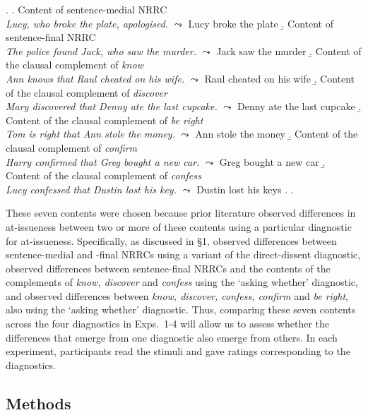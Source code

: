 \documentclass[times,linguex,xcolor]{glossa}
\begin{document}
  \ex.\label{stims}
    \a.\label{stims.a} Content of sentence-medial NRRC \\
      \emph{Lucy, who broke the plate, apologised.} $\leadsto$ Lucy broke the plate
    \b.\label{stims.b} Content of sentence-final NRRC \\
    \emph{The police found Jack, who saw the murder.} $\leadsto$ Jack saw the murder
    \b.\label{stims.c} Content of the clausal complement of \emph{know} \\
    \emph{Ann knows that Raul cheated on his wife.} $\leadsto$ Raul cheated on his wife
    \b.\label{stims.d} Content of the clausal complement of \emph{discover} \\
    \emph{Mary discovered that Denny ate the last cupcake.} $\leadsto$ Denny ate the last cupcake
    \b.\label{stims.e} Content of the clausal complement of \emph{be right} \\
    \emph{Tom is right that Ann stole the money.} $\leadsto$ Ann stole the money
    \b.\label{stims.f} Content of the clausal complement of \emph{confirm} \\
    \emph{Harry confirmed that Greg bought a new car.} $\leadsto$ Greg bought a new car
    \b.\label{stims.g} Content of the clausal complement of \emph{confess}  \\
    \emph{Lucy confessed that Dustin lost his key.} $\leadsto$ Dustin lost his keys
    \z.
  \z.

  These seven contents were chosen because prior literature observed differences in at-issueness between two or more of these contents using a particular diagnostic for at-issueness.  Specifically, as discussed in \S1, \citealt{syrett_experimental_2015} observed differences between sentence-medial and -final NRRCs using a variant of the direct-dissent diagnostic, \citealt{tonhauser_how_2018} observed differences between sentence-final NRRCs and the contents of the complements of \emph{know, discover} and \emph{confess} using the `asking whether' diagnostic, and \citealt{degen-tonhauser-glossa} observed differences between \emph{know, discover, confess, confirm} and \emph{be right}, also using the `asking whether' diagnostic. Thus, comparing these seven contents across the four diagnostics in Exps.~1-4 will allow us to assess whether the differences that emerge from one diagnostic also emerge from others. In each experiment, participants read the stimuli and gave ratings corresponding to the diagnostics.

  \subsection{Methods}
    
\end{document}
